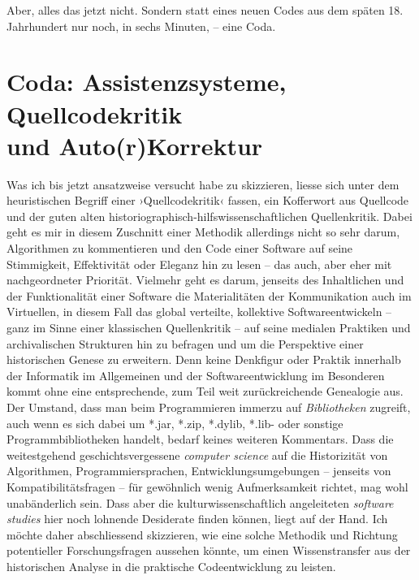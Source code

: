 \documentclass[a4paper,11pt]{article}
\newcommand{\inanf}[1]{›#1‹}
\begin{document}
\begin{comment}
(Git's recursive merge implementation also handles other awkward cases, like a file being modified in one version and renamed in the other, but those are extensions to its three-way merge implementation; not part of the technique for finding three versions to merge.)

Recursive three-way merge can only be used in situations where the tool has knowledge about the total ancestry directed acyclic graph (DAG) of the derivatives to be merged. Consequently, it cannot be used in situations where derivatives or merges do not fully specify their parent(s).

\end{comment}

Aber, alles das jetzt nicht. Sondern statt eines neuen Codes aus dem späten 18. Jahrhundert nur noch, in sechs Minuten, – eine Coda.

\section{Coda: Assistenzsysteme, Quellcodekritik\\ und Auto(r)Korrektur}


Was ich bis jetzt ansatzweise versucht habe zu skizzieren, liesse sich unter dem heuristischen Begriff einer \inanf{Quellcodekritik} fassen, ein Kofferwort aus Quellcode und der guten alten historiographisch-hilfswissenschaftlichen Quellenkritik. Dabei geht es mir in diesem Zuschnitt einer Methodik allerdings nicht so sehr darum, Algorithmen zu kommentieren und den Code einer Software auf seine Stimmigkeit, Effektivität oder Eleganz hin zu lesen – das auch, aber eher mit nachgeordneter Priorität. Vielmehr geht es darum, jenseits des Inhaltlichen und der Funktionalität einer Software die Materialitäten der Kommunikation auch im Virtuellen, in diesem Fall das global verteilte, kollektive Softwareentwickeln – ganz im Sinne einer klassischen Quellenkritik – auf seine medialen Praktiken und archivalischen Strukturen hin zu befragen und um die Perspektive einer historischen Genese zu erweitern. Denn keine Denkfigur oder Praktik innerhalb der Informatik im Allgemeinen und der Softwareentwicklung im Besonderen kommt ohne eine entsprechende, zum Teil weit zurückreichende Genealogie aus. Der Umstand, dass man beim Programmieren immerzu auf \emph{Bibliotheken} zugreift, auch wenn es sich dabei um *.jar, *.zip, *.dylib, *.lib- oder sonstige Programmbibliotheken handelt, bedarf keines weiteren Kommentars. Dass die weitestgehend geschichtsvergessene \emph{computer science} auf die Historizität von Algorithmen, Programmiersprachen, Entwicklungsumgebungen – jenseits von Kompatibilitätsfragen – für gewöhnlich wenig Aufmerksamkeit richtet, mag wohl unabänderlich sein. Dass aber die kulturwissenschaftlich angeleiteten \emph{software studies} hier noch lohnende Desiderate finden können, liegt auf der Hand. Ich möchte daher abschliessend skizzieren, wie eine solche Methodik und Richtung potentieller Forschungsfragen aussehen könnte, um einen Wissenstransfer aus der historischen Analyse in die praktische Codeentwicklung zu leisten. 
\end{document}
